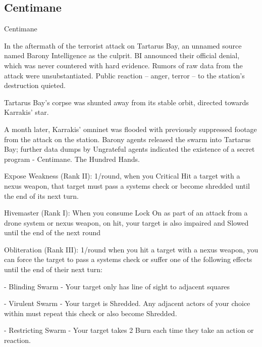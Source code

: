 \subsection{Centimane}

                                                   Centimane  

In the aftermath of the terrorist attack on Tartarus Bay, an unnamed source named Barony Intelligence as  
the culprit. BI announced their official denial, which was never countered with hard evidence. Rumors of raw  
data from the attack were unsubstantiated. Public reaction -- anger, terror -- to the station’s destruction  
quieted.   

 Tartarus Bay’s corpse was shunted away from its stable orbit, directed towards Karrakis’ star.   

A month later, Karrakis’ omninet was flooded with previously suppressed footage from the attack on the  
station. Barony agents released the swarm into Tartarus Bay; further data dumps by Ungrateful agents  
indicated the existence of a secret program - Centimane. The Hundred Hands.  

                                                                                                                     


Expose Weakness (Rank II): 1/round, when you Critical Hit a target with a nexus weapon, that  
target must pass a systems check or become shredded until the end of its next turn.
 
Hivemaster (Rank I): When you consume Lock On as part of an attack from a drone system or  
nexus weapon, on hit, your target is also impaired and Slowed until the end of the next round
 
Obliteration (Rank III): 1/round when you hit a target with a nexus weapon, you can force the  
target to pass a systems check or suffer one of the following effects until the end of their next  
turn:
 
	        - Blinding Swarm - Your target only has line of sight to adjacent squares
 
	        - Virulent Swarm - Your target is Shredded. Any adjacent actors of your choice within  
must repeat this check or also become Shredded.
 
	        - Restricting Swarm - Your target takes 2 Burn each time they take an action or reaction.
 